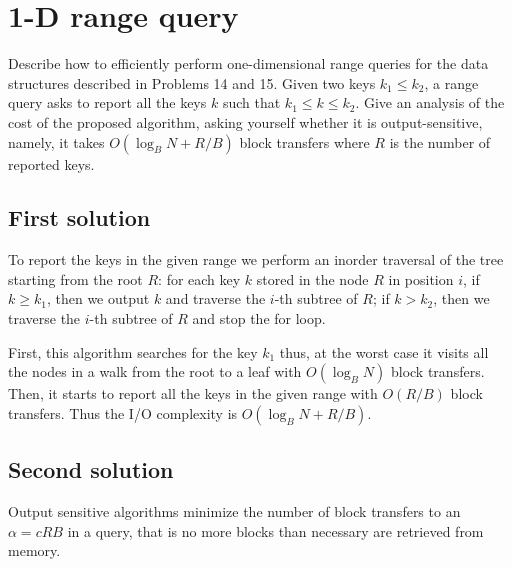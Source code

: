 \section{1-D range query}
Describe how to efficiently perform one-dimensional range queries for the data structures described in Problems 14 and 15. Given two keys $k_1 \leq k_2$, a range query asks to report all the keys $k$ such that $k_1 \leq k \leq k_2$. Give an analysis of the cost of the proposed algorithm, asking yourself whether it is output-sensitive, namely, it takes $O(\log_B N + R/B)$ block transfers where $R$ is the number of reported keys.

\subsection{First solution}
To report the keys in the given range we perform an inorder traversal of the tree starting from the root $R$: for each key $k$ stored in the node $R$ in position $i$, if $k \geq k_1$, then we output $k$ and traverse the $i$-th subtree of $R$; if $k > k_2$, then we traverse the $i$-th subtree of $R$ and stop the for loop.
\begin{center}
\end{center}

First, this algorithm searches for the key $k_1$ thus, at the worst case it visits all the nodes in a walk from the root to a leaf with $O(\log_B N)$ block transfers. Then, it starts to report all the keys in the given range with $O(R/B)$ block transfers. Thus the I/O complexity is $O(\log_B N + R/B)$.

\subsection{Second solution}
Output sensitive algorithms minimize the number of block transfers to an $\alpha = c{R}{B}$ in a query, that is no more blocks than necessary are retrieved from memory.

